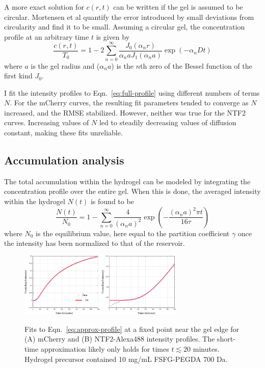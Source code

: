 A more exact solution for $c(r,t)$ can be written if the gel is assumed to be circular.  Mortensen et al quantify the error introduced by small deviations from circularity and find it to be small.  Assuming a circular gel, the concentration profile at an arbitrary time $t$ is given by
\begin{equation}
\frac{c(r,t)}{T_0} = 1 - 2\sum_{n=0}^\infty \frac{J_0(\alpha_n r)}{\alpha_n a J_1(\alpha_n a)}\exp(-\alpha_n D t)
\label{eq:full-profile}
\end{equation}
where $a$ is the gel radius and ($\alpha_n a$) is the $n$th zero of the Bessel function of the first kind $J_0$.


I fit the intensity profiles to Eqn.~\ref{eq:full-profile} using different numbers of terms $N$.  For the mCherry curves, the resulting fit parameters tended to converge as $N$ increased, and the RMSE stabilized.  However, neither was true for the NTF2 curves.  Increasing values of $N$ led to steadily decreasing values of diffusion constant, making these fits unreliable.

\subsection{Accumulation analysis}

The total accumulation within the hydrogel can be modeled by integrating the concentration profile over the entire gel.  When this is done, the averaged intensity within the hydrogel $N(t)$ is found to be
\begin{equation}
\frac{N(t)}{N_0} = 1-\sum_{n=0}^\infty \frac{4}{(\alpha_na)^2}\exp\left(-\frac{(\alpha_na)^2\pi t}{16\tau}\right)
\label{eq:full-accumulation}
\end{equation} where $N_0$ is the equilibrium value, here equal to the partition coefficient $\gamma$ once the intensity has been normalized to that of the reservoir.

\begin{figure}
\caption[Fits to concentration profiles at a fixed position.]{Fits to Eqn.~\ref{eq:approx-profile} at a fixed point near the gel edge for (A) mCherry and (B) NTF2-Alexa488 intensity profiles.  The short-time approximation likely only holds for times $t \lesssim 20$ minutes. Hydrogel precursor contained 10 mg/mL FSFG-PEGDA 700 Da.}
\centering
\includegraphics[width=0.7\textwidth]{figs/ch04/erfc-time.pdf}
\label{fig:erfc-time}
\end{figure} 

